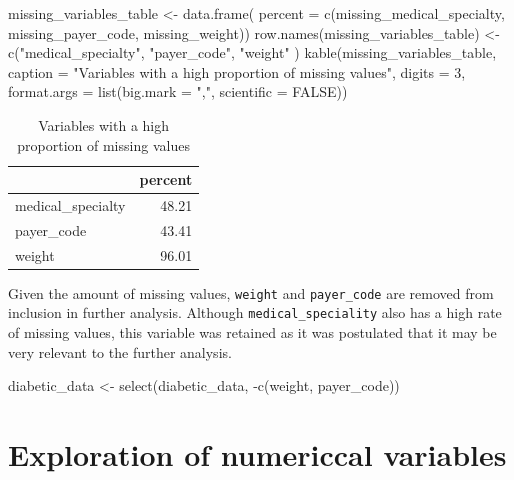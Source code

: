 \documentclass[
]{article}
\newenvironment{Shaded}{\begin{snugshade}}{\end{snugshade}}
\newcommand{\AttributeTok}[1]{\textcolor[rgb]{0.77,0.63,0.00}{#1}}
\newcommand{\ConstantTok}[1]{\textcolor[rgb]{0.00,0.00,0.00}{#1}}
\newcommand{\DecValTok}[1]{\textcolor[rgb]{0.00,0.00,0.81}{#1}}
\newcommand{\FunctionTok}[1]{\textcolor[rgb]{0.00,0.00,0.00}{#1}}
\newcommand{\NormalTok}[1]{#1}
\newcommand{\OtherTok}[1]{\textcolor[rgb]{0.56,0.35,0.01}{#1}}
\newcommand{\SpecialCharTok}[1]{\textcolor[rgb]{0.00,0.00,0.00}{#1}}
\newcommand{\StringTok}[1]{\textcolor[rgb]{0.31,0.60,0.02}{#1}}
\begin{document}
\begin{Shaded}
\begin{Highlighting}[]
\NormalTok{missing\_variables\_table }\OtherTok{\textless{}{-}} \FunctionTok{data.frame}\NormalTok{( }\AttributeTok{percent =} \FunctionTok{c}\NormalTok{(missing\_medical\_specialty, missing\_payer\_code, missing\_weight))}
\FunctionTok{row.names}\NormalTok{(missing\_variables\_table) }\OtherTok{\textless{}{-}} \FunctionTok{c}\NormalTok{(}\StringTok{"medical\_specialty"}\NormalTok{, }\StringTok{"payer\_code"}\NormalTok{, }\StringTok{"weight"}\NormalTok{ )}
\FunctionTok{kable}\NormalTok{(missing\_variables\_table, }\AttributeTok{caption =} \StringTok{"Variables with a high proportion of missing values"}\NormalTok{, }\AttributeTok{digits =} \DecValTok{3}\NormalTok{, }\AttributeTok{format.args =} \FunctionTok{list}\NormalTok{(}\AttributeTok{big.mark =} \StringTok{","}\NormalTok{,}
  \AttributeTok{scientific =} \ConstantTok{FALSE}\NormalTok{))}
\end{Highlighting}
\end{Shaded}

\begin{table}

\caption{\label{tab:unnamed-chunk-8}Variables with a high proportion of missing values}
\centering
\begin{tabular}[t]{l|r}
\hline
  & percent\\
\hline
medical\_specialty & 48.21\\
\hline
payer\_code & 43.41\\
\hline
weight & 96.01\\
\hline
\end{tabular}
\end{table}

Given the amount of missing values, \texttt{weight} and
\texttt{payer\_code} are removed from inclusion in further analysis.
Although \texttt{medical\_speciality} also has a high rate of missing
values, this variable was retained as it was postulated that it may be
very relevant to the further analysis.

\begin{Shaded}
\begin{Highlighting}[]
\NormalTok{diabetic\_data }\OtherTok{\textless{}{-}} \FunctionTok{select}\NormalTok{(diabetic\_data, }\SpecialCharTok{{-}}\FunctionTok{c}\NormalTok{(weight, payer\_code))}
\end{Highlighting}
\end{Shaded}

\hypertarget{exploration-of-numericcal-variables}{%
\section{Exploration of numericcal
variables}\label{exploration-of-numericcal-variables}}
\end{document}

